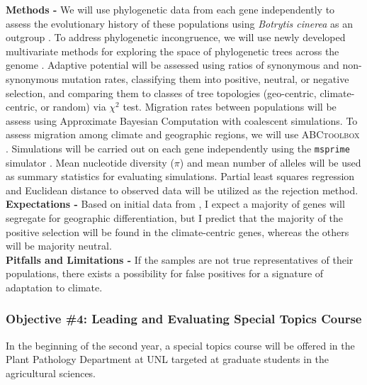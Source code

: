 \documentclass[12pt,letterpaper]{article}
\begin{document}
\noindent \textbf{Methods -} 
We will use phylogenetic data from each gene independently to assess the evolutionary history of these populations using \textit{Botrytis cinerea} as an outgroup \citep{staats2012genome}. 
To address phylogenetic incongruence, we will use newly developed multivariate methods for exploring the space of phylogenetic trees across the genome \citep{kendall2016mapping, jombart2017treespace}. 
Adaptive potential will be assessed using ratios of synonymous and non-synonymous mutation rates, classifying them into positive, neutral, or negative selection, and comparing them to classes of tree topologies (geo-centric, climate-centric, or random) via $\chi^2$ test.
Migration rates between populations will be assess using Approximate Bayesian Computation with coalescent simulations. 
To assess migration among climate and geographic regions, we will use \textsc{ABCtoolbox} \citep{wegmann2010abctoolbox}. 
Simulations will be carried out on each gene independently using the \texttt{msprime} simulator \citep{kelleher2016efficient}. 
Mean nucleotide diversity ($\pi$) and mean number of alleles will be used as summary statistics for evaluating simulations. 
Partial least squares regression and Euclidean distance to observed data will be utilized as the rejection method.\\
\noindent \textbf{Expectations -}
Based on initial data from \citet{attanayake2013sclerotinia}, I expect a majority of genes will segregate for geographic differentiation, but I predict that the majority of the positive selection will be found in the climate-centric genes, whereas the others will be majority neutral.\\
\noindent \textbf{Pitfalls and Limitations -}
If the samples are not true representatives of their populations, there exists a possibility for false positives for a signature of adaptation to climate.

\subsubsection*{Objective \#4: Leading and Evaluating Special Topics Course}

In the beginning of the second year, a special topics course will be offered in the Plant Pathology Department at UNL targeted at graduate students in the agricultural sciences.
\end{document}
